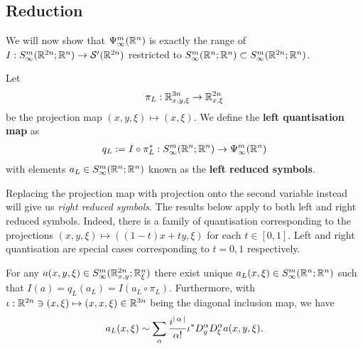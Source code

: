 \documentclass[12pt]{article}
\begin{document}
\subsection{Reduction}
We will now show that $\Psi^{m}_\infty({\mathbb R}^n)$ is exactly the range of $I : S^{m}_\infty({\mathbb R}^{2n}; {\mathbb R}^n) \to \mathcal{S}'({\mathbb R}^{2n})$ restricted to $S^{m}_\infty({\mathbb R}^{n}; {\mathbb R}^n) \subset S^{m}_\infty({\mathbb R}^{2n}; {\mathbb R}^n)$. 
\begin{fdefinition}
    Let 
    \begin{align*}
        \pi_L : {\mathbb R}^{3n}_{x, y, \xi} \to {\ensuremath {\mathbb R}}^{2n}_{x, \xi}
    \end{align*}
    be the projection map $(x, y, \xi) \mapsto (x, \xi)$. We define the \textbf{left quantisation map} as 
    \begin{align*}
        q_L := I \circ \pi_L^* : S^{m}_\infty({\mathbb R}^{n}; {\mathbb R}^n) \to \Psi^{m}_\infty({\mathbb R}^{n}) 
    \end{align*}
    with elements $a_L \in S^{m}_\infty({\mathbb R}^{n}; {\mathbb R}^n)$ known as the \textbf{left reduced symbols}.\\
   
\end{fdefinition}
\begin{rem}
        Replacing the projection map with projection onto the second variable instead will give us \textit{right reduced symbols}. The results below apply to both left and right reduced symbols. Indeed, there is a family of quantisation corresponding to the projections $(x, y, \xi) \mapsto ((1 - t)x + ty, \xi)$ for each $t \in [0, 1]$. Left and right quantisation are special cases corresponding to $t = 0, 1$ respectively. 
\end{rem}
\begin{flemma}[Reduction] \label{lemma : reduction} 
    For any $a(x, y, \xi) \in S^{m}_\infty({\mathbb R}^{2n}_{x, y}; {\mathbb R}^n_\xi)$ there exist unique $a_L(x, \xi) \in S^{m}_\infty({\mathbb R}^{n}; {\mathbb R}^n)$ such that $I(a) = q_L(a_L) = I(a_L \circ \pi_L)$. Furthermore, with $\iota : {\mathbb R}^{2n} \ni (x, \xi) \mapsto (x, x, \xi) \in {\ensuremath {\mathbb R}}^{3n}$ being the diagonal inclusion map, we have 
    \begin{align}
        a_L(x, \xi) \sim \sum_{\alpha} \frac{i^{\left|\, \alpha\,\right|}}{\alpha !} \iota^* D^\alpha_y D^\alpha_\xi a(x, y, \xi). 
    \end{align}
\end{flemma}
\end{document}
